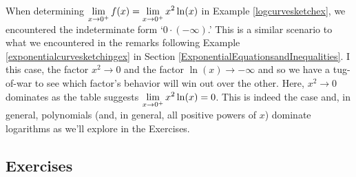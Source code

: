 When determining $\displaystyle{\lim_{x \rightarrow 0^{+}} f(x)  = \lim_{x \rightarrow 0^{+}} x^2 \ln(x) }$ in Example \ref{logcurvesketchex}, we encountered the indeterminate form `$0 \cdot (-\infty)$.'  This is a similar scenario to what we encountered in the remarks following Example \ref{exponentialcurvesketchingex} in Section \ref{ExponentialEquationsandInequalities}.  I this case, the factor $x^2 \rightarrow 0$ and the factor $\ln(x) \rightarrow -\infty$ and so we have a tug-of-war to see which factor's behavior will win out over the other.  Here, $x^2 \rightarrow 0$ dominates as the table suggests $\displaystyle{\lim_{x \rightarrow 0^{+}} x^2 \ln(x) = 0}$.  This is indeed the case and, in general, polynomials (and, in general, all positive powers of $x$) dominate logarithms as we'll explore in the Exercises.  

\newpage

\subsection{Exercises}



\closegraphsfile